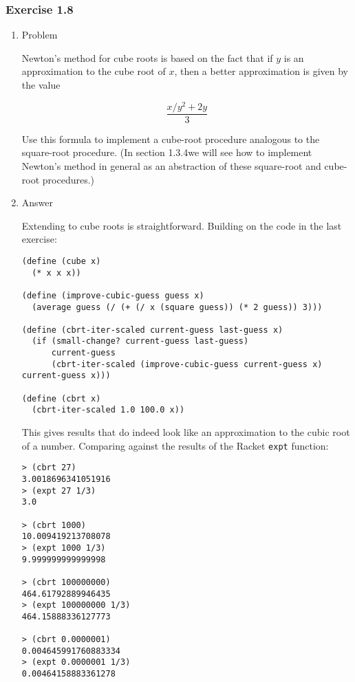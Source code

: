 \documentclass[11pt]{article}
\begin{document}
\subsubsection{Exercise 1.8}
\label{sec-1-2-3}
\begin{enumerate}
\item Problem
\label{sec-1-2-3-1}

Newton's method for cube roots is based on the fact that if $y$ is
an approximation to the cube root of $x$, then a better
approximation is given by the value

$$ \frac{x/y^2 + 2y}{3} $$

Use this formula to implement a cube-root procedure analogous to
the square-root procedure.  (In section 1.3.4we will see how to
implement Newton's method in general as an abstraction of these
square-root and cube-root procedures.)
\item Answer
\label{sec-1-2-3-2}

Extending to cube roots is straightforward. Building on the code in the last
exercise:

\begin{verbatim}
(define (cube x)
  (* x x x))

(define (improve-cubic-guess guess x)
  (average guess (/ (+ (/ x (square guess)) (* 2 guess)) 3)))

(define (cbrt-iter-scaled current-guess last-guess x)
  (if (small-change? current-guess last-guess)
      current-guess
      (cbrt-iter-scaled (improve-cubic-guess current-guess x) current-guess x)))

(define (cbrt x)
  (cbrt-iter-scaled 1.0 100.0 x))
\end{verbatim}

This gives results that do indeed look like an approximation to the
cubic root of a number. Comparing against the results of the Racket
\texttt{expt} function:

\begin{verbatim}
> (cbrt 27)
3.0018696341051916
> (expt 27 1/3)
3.0

> (cbrt 1000)
10.009419213708078
> (expt 1000 1/3)
9.999999999999998

> (cbrt 100000000)
464.61792889946435
> (expt 100000000 1/3)
464.15888336127773

> (cbrt 0.0000001)
0.004645991760883334
> (expt 0.0000001 1/3)
0.00464158883361278
\end{verbatim}
\end{enumerate}
\end{document}
